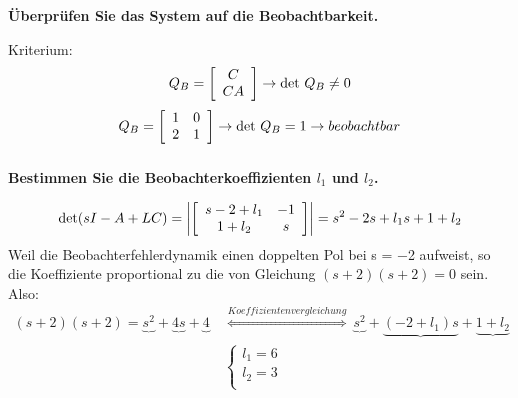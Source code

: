 \subsubsection{}\textbf{Überprüfen Sie das System auf die Beobachtbarkeit.}

Kriterium:
\begin{equation}
    Q_B=\left[\begin{array}{c}
            C  \\
            CA \\
        \end{array}\right]\rightarrow\mathop{}\!\mathrm{det}\ Q_B\neq0
\end{equation}
\begin{equation}
    Q_B=\left[\begin{array}{cc}
            1 & 0 \\
            2 & 1 \\
        \end{array}\right]\rightarrow\mathop{}\!\mathrm{det}\ Q_B=1\rightarrow beobachtbar
\end{equation}
\subsubsection{}\textbf{Bestimmen Sie die Beobachterkoeffizienten $l_1$ und $l_2$.}

\begin{equation}
    \mathop{}\!\mathrm{det}(sI-A+LC)=\left|\left[\begin{array}{cc}
            s-2+l_1 & -1 \\
            1+l_2   & s  \\
        \end{array}\right]\right|=s^2-2s+l_1s+1+l_2
\end{equation}
Weil die Beobachterfehlerdynamik einen doppelten Pol bei s = −2 aufweist, so die Koeffiziente proportional zu die von Gleichung $(s+2)(s+2)=0$ sein. Also:
\begin{equation}
    \begin{aligned}
        (s+2)(s+2)=\underbrace{s^2}+\underbrace{4s}+\underbrace{4}\  & \overset{Koeffizientenvergleichung}{\Longleftrightarrow}\ \underbrace{s^2}+\underbrace{(-2+l_1)s}+\underbrace{1+l_2} \\
                                                                     & \left\{\begin{array}{c}
            l_1=6 \\
            l_2=3 \\
        \end{array}\right.                                                                             \\
    \end{aligned}
\end{equation}